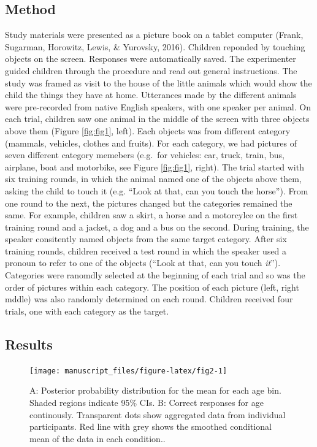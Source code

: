\documentclass[man,floatsintext]{apa6}
\begin{document}
\subsection{Method}\label{method}

Study materials were presented as a picture book on a tablet computer
(Frank, Sugarman, Horowitz, Lewis, \& Yurovsky, 2016). Children reponded
by touching objects on the screen. Responses were automatically saved.
The experimenter guided children through the procedure and read out
general instructions. The study was framed as visit to the house of the
little animals which would show the child the things they have at home.
Utterances made by the different animals were pre-recorded from native
English speakers, with one speaker per animal. On each trial, children
saw one animal in the middle of the screen with three objects above them
(Figure \ref{fig:fig1}, left). Each objects was from different category
(mammals, vehicles, clothes and fruits). For each category, we had
pictures of seven different category memebers (e.g.~for vehicles: car,
truck, train, bus, airplane, boat and motorbike, see Figure
\ref{fig:fig1}, right). The trial started with six training rounds, in
which the animal named one of the objects above them, asking the child
to touch it (e.g. \enquote{Look at that, can you touch the horse}). From
one round to the next, the pictures changed but the categories remained
the same. For example, children saw a skirt, a horse and a motorcylce on
the first training round and a jacket, a dog and a bus on the second.
During training, the speaker consitently named objects from the same
target category. After six training rounds, children received a test
round in which the speaker used a pronoun to refer to one of the objects
(\enquote{Look at that, can you touch \emph{it}}). Categories were
ranomdly selected at the beginning of each trial and so was the order of
pictures within each category. The position of each picture (left, right
mddle) was also randomly determined on each round. Children received
four trials, one with each category as the target.

\subsection{Results}\label{results}

\begin{figure}

{\centering \texttt{[image: manuscript\_files/figure-latex/fig2-1]} 

}

\caption{A: Posterior probability distribution for the mean for each age bin. Shaded regions indicate 95\% CIs. B: Correct  responses for age continously. Transparent dots show aggregated data from individual participants. Red line with grey shows the smoothed conditional mean of the data in each condition..}\label{fig:fig2}
\end{figure}
\end{document}
